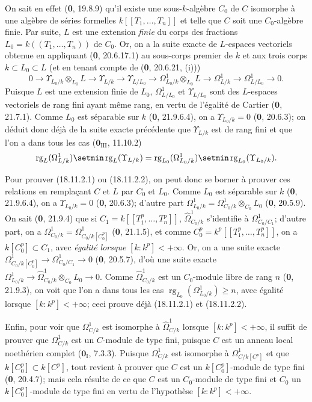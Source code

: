 On sait en effet (\textbf{0}, 19.8.9) qu'il existe une sous-$k$-algèbre $C_0$ de $C$ isomorphe à une algèbre de séries formelles $k[[T_1,\ldots,T_n]]$ et telle que $C$ soit une $C_0$-algèbre finie. Par suite, $L$ est une extension \emph{finie} du corps des fractions $L_0=k((T_1,\ldots,T_n))$ de $C_0$. Or, on a la suite exacte de $L$-espaces vectoriels obtenue en appliquant (\textbf{0}, 20.6.17.1) au sous-corps premier de $k$ et aux trois corps $k\subset L_0\subset L$ (et en tenant compte de (\textbf{0}, 20.6.21, (i)))
\[
  0\to\Upsilon_{L_0/k}\otimes_{L_0}L\to\Upsilon_{L/k}\to\Upsilon_{L/L_0}
  \to\Omega^1_{L_0/k}\otimes_{L_0}L\to\Omega^1_{L/k}\to\Omega^1_{L/L_0}\to0.
\]
Puisque $L$ est une extension finie de $L_0$, $\Omega^1_{L/L_0}$ et $\Upsilon_{L/L_0}$ sont des $L$-espaces vectoriels de rang fini ayant même rang, en vertu de l'égalité de Cartier (\textbf{0}, 21.7.1). Comme $L_0$ est séparable sur $k$ (\textbf{0}, 21.9.6.4), on a $\Upsilon_{L_0/k}=0$ (\textbf{0}, 20.6.3); on déduit donc déjà de la suite exacte précédente que $\Upsilon_{L/k}$ est de rang fini et que l'on a dans tous les cas ($\mathbf{0}_{\mathrm{III}}$, 11.10.2)
\[
  \operatorname{rg}_L(\Omega^1_{L/k})\setmin\operatorname{rg}_L(\Upsilon_{L/k})
  =\operatorname{rg}_{L_0}(\Omega^1_{L_0/k})\setmin\operatorname{rg}_{L_0}(\Upsilon_{L_0/k}).
\]

Pour prouver (18.11.2.1) ou (18.11.2.2), on peut donc se borner à prouver ces relations en remplaçant $C$ et $L$ par $C_0$ et $L_0$. Comme $L_0$ est séparable sur $k$ (\textbf{0}, 21.9.6.4), on a $\Upsilon_{L_0/k}=0$ (\textbf{0}, 20.6.3); d'autre part $\Omega^1_{L_0/k}=\Omega^1_{C_0/k}\otimes_{C_0}L_0$ (\textbf{0}, 20.5.9). On sait (\textbf{0}, 21.9.4) que si $C_1=k[[T_1^p,\ldots,T_n^p]]$, $\hat{\Omega}^1_{C_0/k}$ s'identifie à $\Omega^1_{C_0/C_1}$; d'autre part, on a $\Omega^1_{C_0/k}=\Omega^1_{C_0/k[C_0^p]}$ (\textbf{0}, 21.1.5), et comme $C_0^p=k^p[[T_1^p,\ldots,T_n^p]]$, on a $k[C_0^p]\subset C_1$, avec \emph{égalité lorsque} $[k:k^p]<+\infty$. Or, on a une suite exacte $\Omega^1_{C_0/k[C_0^p]}\to\Omega^1_{C_0/C_1}\to0$ (\textbf{0}, 20.5.7), d'où une suite exacte $\Omega^1_{L_0/k}\to\hat{\Omega}^1_{C_0/k}\otimes_{C_0}L_0\to0$. Comme $\hat{\Omega}^1_{C_0/k}$ est un $C_0$-module libre de rang $n$ (\textbf{0}, 21.9.3), on voit que l'on a dans tous les cas $\operatorname{rg}_{L_0}(\Omega^1_{L_0/k})\geq n$, avec égalité lorsque $[k:k^p]<+\infty$; ceci prouve déjà (18.11.2.1) et (18.11.2.2).

Enfin, pour voir que $\Omega^1_{C/k}$ est isomorphe à $\hat{\Omega}^1_{C/k}$ lorsque $[k:k^p]<+\infty$, il suffit de prouver que $\Omega^1_{C/k}$ est un $C$-module de type fini, puisque $C$ est un anneau local noethérien complet ($\mathbf{0}_{\mathrm I}$, 7.3.3). Puisque $\Omega^1_{C/k}$ est isomorphe à $\Omega^1_{C/k[C^p]}$ et que $k[C_0^p]\subset k[C^p]$, tout revient à prouver que $C$ est un $k[C_0^p]$-module de type fini (\textbf{0}, 20.4.7); mais cela résulte de ce que $C$ est un $C_0$-module de type fini et $C_0$ un $k[C_0^p]$-module de type fini en vertu de l'hypothèse $[k:k^p]<+\infty$.

